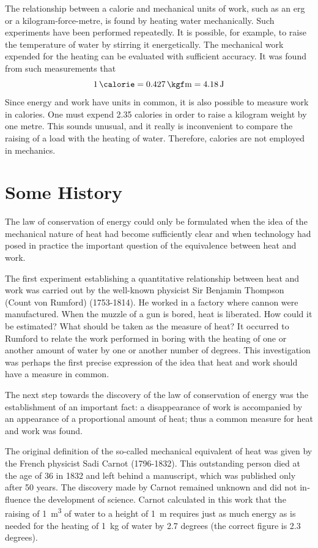 The relationship between a calorie and mechanical units of work, such as an erg or a kilogram-force-metre, is found by heating water mechanically. Such experiments have been performed repeatedly. It is possible, for example, to raise the temperature of water by stirring it energetically. The mechanical work expended for the heating can be evaluated with sufficient accuracy. It was found from such measurements that
\begin{equation*}%
\SI{1}{\calorie} = \SI{0.427}{\kgf\meter} =  \SI{4.18}{\joule}
\end{equation*}
Since energy and work have units in common, it is also possible to measure work in calories. One must expend 2.35 calories in order to raise a kilogram weight by one metre. This sounds unusual, and it really is inconvenient to compare the raising of a load with the heating of water. Therefore, calories are not employed in mechanics.

\section{Some History}


The law of conservation of energy could only be for­mulated when the idea of the mechanical nature of heat had become sufficiently clear and when technology had posed in practice the important question of the equivalence between heat and work.

The first experiment establishing a quantitative re­lationship between heat and work was carried out by the well-known physicist Sir Benjamin Thompson (Count von Rumford) (1753-1814). He worked in a factory where cannon were manufactured. When the muzzle of a gun is bored, heat is liberated. How could it be estimated? What should be taken as the measure of heat? It oc­curred to Rumford to relate the work performed in boring with the heating of one or another amount of water by one or another number of degrees. This in­vestigation was perhaps the first precise expression of the idea that heat and work should have a measure in common.

The next step towards the discovery of the law of conservation of energy was the establishment of an important fact: a disappearance of work is accompanied by an appearance of a proportional amount of heat; thus a common measure for heat and work was found.

The original definition of the so-called mechanical equivalent of heat was given by the French physicist Sadi Carnot (1796-1832). This outstanding person died at the age of 36 in 1832 and left behind a manuscript, which was published only after 50 years. The discovery made by Carnot remained unknown and did not in­fluence the development of science. Carnot calculated in this work that the raising of \SI{1}{\meter\cubed} of water to a height of \SI{1}{\meter} requires just as much energy as is needed for the heating of \SI{1}{\kilo\gram} of water by 2.7 degrees (the correct figure is 2.3 degrees).

